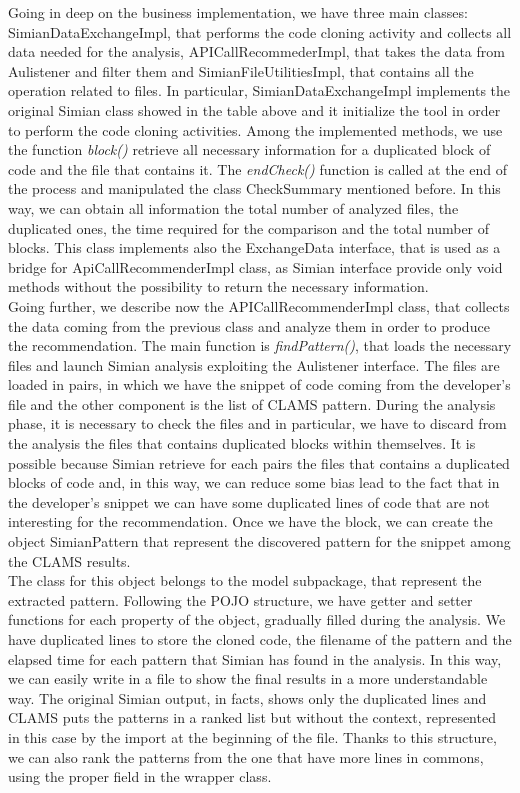 Going in deep on the business implementation, we have three main classes: SimianDataExchangeImpl, that performs the code cloning activity and collects all data needed for the analysis, APICallRecommederImpl, that takes the data from Aulistener and filter them and SimianFileUtilitiesImpl, that contains all the operation related to files. In particular, SimianDataExchangeImpl implements the original Simian class showed in the table above and it initialize the tool in order to perform the code cloning activities. Among the implemented methods, we use the function \textit{block()} retrieve all necessary information for a duplicated block of code and the file that contains it. The \textit{endCheck()} function is called at the end of the process and manipulated the class CheckSummary mentioned before. In this way, we can obtain all information the total number of analyzed files, the duplicated ones, the time required for the comparison and the total number of blocks. This class implements also the ExchangeData interface, that is used as a bridge for ApiCallRecommenderImpl class, as Simian interface provide only void methods without the possibility to return the necessary information.\\
Going further, we describe now the APICallRecommenderImpl class, that collects the data coming from the previous class and analyze them in order to produce the recommendation. The main function is \textit{findPattern()}, that loads the necessary files and launch Simian analysis exploiting the Aulistener interface. The files are loaded in pairs, in which we have the snippet of code coming from the developer's file and the other component is the list of CLAMS pattern. During the analysis phase, it is necessary to check the files and in particular, we have to discard from the analysis the files that contains duplicated blocks within themselves. It is possible because Simian retrieve for each pairs the files that contains a duplicated blocks of code and, in this way, we can reduce some bias lead to the fact that in the developer's snippet we can have some duplicated lines of code that are not interesting for the recommendation. Once we have the block, we can create the object SimianPattern that represent the discovered pattern for the snippet among the CLAMS results.\\
The class for this object belongs to the model subpackage, that represent the extracted pattern. Following the POJO structure, we have getter and setter functions for each property of the object, gradually filled during the analysis. We have duplicated lines to store the cloned code, the filename of the pattern and the elapsed time for each pattern that Simian has found in the analysis. In this way, we can easily write in a file to show the final results in a more understandable way. The original Simian output, in facts, shows only the duplicated lines and CLAMS puts the patterns in a ranked list but without the context, represented in this case by the import at the beginning of the file. Thanks to this structure, we can also rank the patterns from the one that have more lines in commons, using the proper field in the wrapper class.\\
